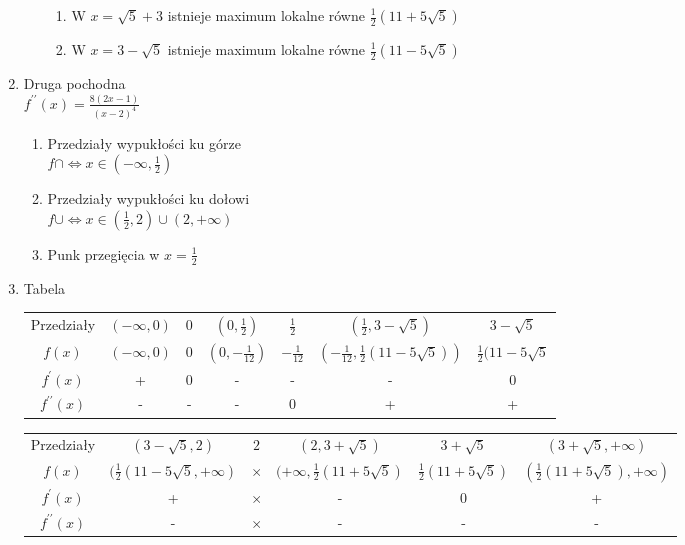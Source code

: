 \documentclass[11pt]{scrartcl}
\begin{document}
\begin{enumerate}
\begin{enumerate}
\begin{enumerate}
					\item W $ x = \sqrt{5} + 3 $ istnieje maximum lokalne równe $ \frac{1}{2}(11 + 5\sqrt{5}) $
					\item W $ x = 3 - \sqrt{5} $ istnieje maximum lokalne równe $ \frac{1}{2}(11 - 5\sqrt{5}) $
				\end{enumerate}
			\end{enumerate}
		\item Druga pochodna \\
			$ f^{\prime\prime}(x) = \frac{8(2x-1)}{(x-2)^4} $
			\begin{enumerate}
				\item Przedziały wypukłości ku górze \\
				$ f\cap \Leftrightarrow x \in (-\infty, \frac{1}{2}) $
				\item Przedziały wypukłości ku dołowi \\
				$ f\cup \Leftrightarrow x \in (\frac{1}{2},2) \cup (2, +\infty) $
				\item Punk przegięcia w $ x = \frac{1}{2} $
			\end{enumerate}
		\item Tabela \\
			\begin{center}
				\begin{tabular}{ |c|c|c|c|c|c|c| }
					\hline
					Przedziały &
					$ (-\infty, 0) $ &
						$ 0 $ &
						$ (0,\frac{1}{2}) $ &
						$ \frac{1}{2} $ &
						$ (\frac{1}{2} , 3 - \sqrt{5}) $ &
						$ 3 - \sqrt{5} $ \\
					$ f(x) $ &
						$ (-\infty, 0) $ &
						$ 0 $ &
						$ (0, - \frac{1}{12}) $ &
						$ - \frac{1}{12} $ &
						$ (- \frac{1}{12}, \frac{1}{2}(11 - 5\sqrt{5} )) $ &
						$ \frac{1}{2}(11 - 5\sqrt{5} $ \\
					$ f^{\prime}(x) $ &
						+ &
						0 &
						- &
						- &
						- &
						0 \\
					$ f^{\prime\prime}(x) $ &
						- &
						- &
						- &
						0 &
						+ &
						+ \\
					\hline
				\end{tabular}
				\begin{tabular}{ |c|c|c|c|c|c| }
					\hline
					Przedziały &
						$ (3 - \sqrt{5}, 2) $ &
						$ 2 $ &
						$ (2 , 3 + \sqrt{5}) $ &
						$ 3 + \sqrt{5} $ &
						$ (3 + \sqrt{5}, +\infty) $\\
					$ f(x) $ &
						$ (\frac{1}{2}(11 - 5\sqrt{5}, +\infty) $ &
						$ \times $ &
						$ (+\infty, \frac{1}{2}(11 + 5\sqrt{5}) $ &
						$\frac{1}{2}(11 + 5\sqrt{5})  $ &
						$ (\frac{1}{2}(11 + 5\sqrt{5}), +\infty) $\\
					$ f^{\prime}(x) $ &
						+ &
						$ \times $ &
						- &
						0 &
						+ \\
					$ f^{\prime\prime}(x) $ &
						- &
						$ \times$  &
						- &
						- &
						- \\
					\hline
				\end{tabular}
			\end{center}
	\end{enumerate}
\end{document}
